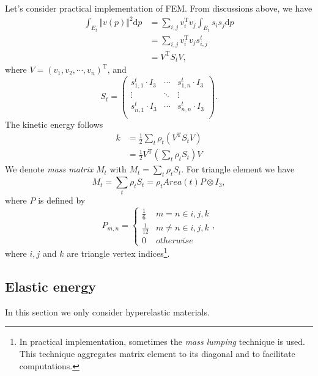 \documentclass{fancydoc}
\newcommand{\trans}{\mathrm{T}}
\newcommand{\diffd}{\mathrm{d}}
\begin{document}
Let's consider practical implementation of FEM. From discussions above, we have
\begin{subequations}
	\begin{align}
	\int_{E_t} \Vert v(p) \Vert^2 \diffd p &= \sum_{i, j}v_i^\trans v_j \int_{E_t} s_i s_j \diffd p\\
	&= \sum_{i, j}v_i^\trans v_j  s^t_{i,j} \\ 
	&= V^\trans S_t V,
	\end{align}
\end{subequations}
where $V = (v_1, v_2, \cdots, v_n)^\trans$, and
\begin{equation*}
S_t = \begin{pmatrix}
s_{1,1}^t \cdot I_3  & \cdots & s^t_{1,n} \cdot I_3 \\
\vdots & \ddots & \vdots \\
s_{n, 1}^t \cdot I_3 & \cdots & s^t_{n,n} \cdot I_3 \\
\end{pmatrix}.
\end{equation*}
The kinetic energy follows
\begin{subequations}
	\begin{align}
	k &= \frac{1}{2} \sum_t \rho_t (V^\trans S_t V) \\
	  &= \frac{1}{2} V^\trans (\sum_t \rho_t S_t)V
	\end{align}
\end{subequations}
We denote \textit{mass matrix} $M_t$ with $M_t = \sum_t \rho_t S_t$. For triangle element we have
\begin{equation}
M_t = \sum_t \rho_t S_t = \rho_t Area(t) P \otimes I_3,
\end{equation}
where $P$ is defined by 
\[P_{m,n} = \begin{cases}
\frac{1}{6} & m = n \in {i,j,k} \\
\frac{1}{12} & m \neq n \in {i,j,k} \\
0 & otherwise
\end{cases},
\] where $i, j$ and $k$ are triangle vertex indices\footnote{In practical implementation, sometimes the \textit{mass lumping} technique is used. This technique aggregates matrix element to its diagonal and to facilitate computations.}.

\subsection{Elastic energy}
In this section we only consider hyperelastic materials.
\end{document}
